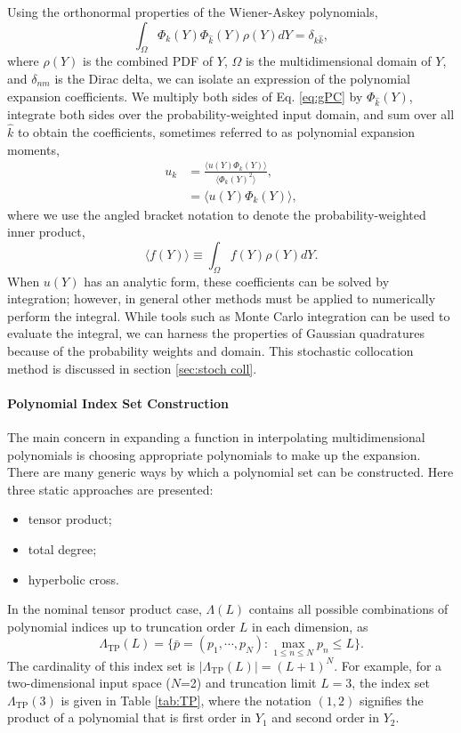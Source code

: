 Using the orthonormal properties of the Wiener-Askey polynomials,
\begin{equation}
  \int_\Omega \Phi_k(Y)\Phi_{\hat k}(Y) \rho(Y) dY = \delta_{k\hat k},
\end{equation}
where $\rho(Y)$ is the combined PDF of $Y$, $\Omega$ is the multidimensional domain of $Y$, and $\delta_{nm}$
is the Dirac delta, we can isolate an expression of the polynomial expansion coefficients.
We multiply both sides of Eq. \ref{eq:gPC} by
$\Phi_{\hat k}(Y)$, integrate both sides over the probability-weighted input domain, and sum over all $\hat k$
to obtain the coefficients, sometimes referred to as polynomial expansion moments,
\begin{align}\label{eq:polycoeff}
  u_k &= \frac{\langle u(Y)\Phi_k(Y) \rangle}{\langle \Phi_k(Y)^2 \rangle},\\
      &= \langle u(Y)\Phi_k(Y) \rangle,
\end{align}
where we use the angled bracket notation to denote the probability-weighted inner product,
\begin{equation}
  \langle f(Y) \rangle \equiv \int_\Omega f(Y)\rho(Y) dY.
\end{equation}
When $u(Y)$ has an analytic form, these coefficients can be solved by integration; however, in general other
methods must be applied to numerically perform the integral.  While tools such as Monte Carlo integration can
be used to evaluate the integral, we can harness the properties of Gaussian quadratures because of the
probability weights and domain.  This stochastic collocation method is discussed in section \ref{sec:stoch
coll}.
\paragraph{Polynomial Index Set Construction}\label{sec:index sets}
The main concern in expanding a function in interpolating multidimensional polynomials is choosing appropriate polynomials to
make up the expansion.
There are many generic ways by which a polynomial set can be constructed.  Here  three static
approaches are presented: 
\begin{itemize}
  \item tensor product;
  \item total degree;
  \item hyperbolic cross.
\end{itemize}
In the nominal tensor
product case, $\Lambda(L)$ contains all possible combinations of polynomial indices up to truncation order $L$ in each
dimension, as
\begin{equation}
  \Lambda_\text{TP}(L)=\Big\{\bar p=(p_1,\cdots,p_N): \max_{1\leq n\leq N}p_n\leq L
\Big\}.
\end{equation}
The cardinality of this index set is $|\Lambda_\text{TP}(L)|=(L+1)^N$. For example, for a two-dimensional
input space ($N$=2) and truncation limit $L=3$, the index set $\Lambda_\text{TP}(3)$ is given in Table
\ref{tab:TP}, where the notation $(1,2)$ signifies the product of a polynomial that is first order in $Y_1$
and second order in $Y_2$.

